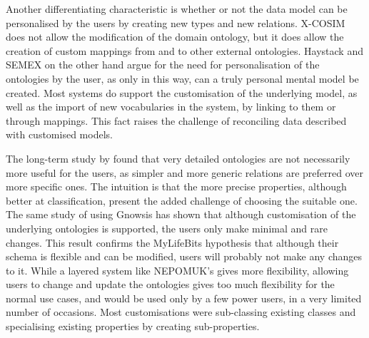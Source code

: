 Another differentiating characteristic is whether or not the data model can be personalised by the users by creating new types and new relations. X-COSIM does not allow the modification of the domain ontology, but it does allow the creation of custom mappings from and to other external ontologies. Haystack and SEMEX on the other hand argue for the need for personalisation of the ontologies by the user, as only in this way, can a truly personal mental model be created. Most systems do support the customisation of the underlying model, as well as the import of new vocabularies in the system, by linking to them or through mappings. This fact raises the challenge of reconciling data described with customised models. 

The long-term study by \cite{Sauermann2008} found that very detailed ontologies are not necessarily more useful for the users, as simpler and more generic relations are preferred over more specific ones. The intuition is that the more precise properties, although better at classification, present the added challenge of choosing the suitable one. 
The same study of using Gnowsis has shown that although customisation of the underlying ontologies is supported, the users only make minimal and rare changes. This result confirms the MyLifeBits hypothesis that although their schema is flexible and can be modified, users will probably not make any changes to it. While a layered system like NEPOMUK's gives more flexibility, allowing users to change and update the ontologies gives too much flexibility for the normal use cases, and would be used only by a few power users, in a very limited number of occasions. Most customisations were sub-classing existing classes and specialising existing properties by creating sub-properties. 
